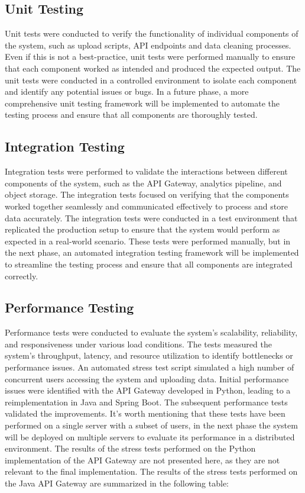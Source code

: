 \subsection{Unit Testing}
Unit tests were conducted to verify the functionality of individual components of the system, such as upload scripts, API endpoints and data cleaning processes. Even if this is not a best-practice, unit tests were performed manually to ensure that each component worked as intended and produced the expected output. The unit tests were conducted in a controlled environment to isolate each component and identify any potential issues or bugs. In a future phase, a more comprehensive unit testing framework will be implemented to automate the testing process and ensure that all components are thoroughly tested.

\subsection{Integration Testing}
Integration tests were performed to validate the interactions between different components of the system, such as the API Gateway, analytics pipeline, and object storage. The integration tests focused on verifying that the components worked together seamlessly and communicated effectively to process and store data accurately. The integration tests were conducted in a test environment that replicated the production setup to ensure that the system would perform as expected in a real-world scenario.
These tests were performed manually, but in the next phase, an automated integration testing framework will be implemented to streamline the testing process and ensure that all components are integrated correctly.

\subsection{Performance Testing}
Performance tests were conducted to evaluate the system's scalability, reliability, and responsiveness under various load conditions. The tests measured the system's throughput, latency, and resource utilization to identify bottlenecks or performance issues. An automated stress test script simulated a high number of concurrent users accessing the system and uploading data. Initial performance issues were identified with the API Gateway developed in Python, leading to a reimplementation in Java and Spring Boot. The subsequent performance tests validated the improvements.
It's worth mentioning that these tests have been performed on a single server with a subset of users, in the next phase the system will be deployed on multiple servers to evaluate its performance in a distributed environment.
\newline
The results of the stress tests performed on the Python implementation of the API Gateway are not presented here, as they are not relevant to the final implementation. The results of the stress tests performed on the Java API Gateway are summarized in the following table:

